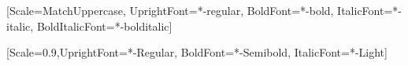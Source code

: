 \setsansfont{texgyreadventor}[Scale=MatchUppercase, UprightFont=*-regular, BoldFont=*-bold, ItalicFont=*-italic, BoldItalicFont=*-bolditalic]



\setmonofont{SourceCodePro}[Scale=0.9,UprightFont=*-Regular, BoldFont=*-Semibold, ItalicFont=*-Light]
\usepackage{xltxtra}
\usepackage{fontawesome}
\usepackage[final]{microtype}


\usepackage[draft=false]{scrlayer-scrpage} %

\flushbottom


\usepackage[shortlabels,inline]{enumitem}
\usepackage[autostyle,german=quotes,english=british]{csquotes}
\usepackage{makeidx}
\usepackage{wrapfig}
\usepackage{float}
\usepackage[margin=10pt, font=small, labelfont={sf, bf}, format=plain, indention=1em]{caption}
\captionsetup[wrapfigure]{name=Abb. }
\usepackage{stackrel}
\usepackage{multicol}
\usepackage{booktabs}


